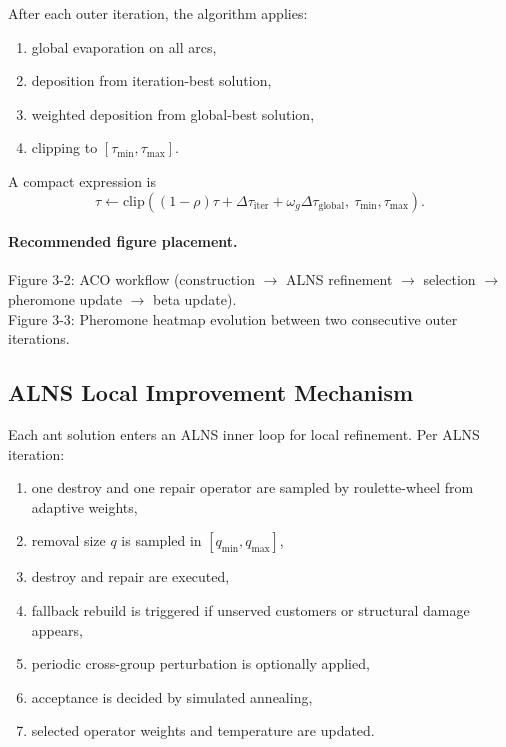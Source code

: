 \documentclass[review,12pt]{elsarticle}
\begin{document}
After each outer iteration, the algorithm applies:
\begin{enumerate}
  \item global evaporation on all arcs,
  \item deposition from iteration-best solution,
  \item weighted deposition from global-best solution,
  \item clipping to \([\tau_{\min},\tau_{\max}]\).
\end{enumerate}
A compact expression is
\begin{equation}
\tau \leftarrow \mathrm{clip}\!\left((1-\rho)\tau + \Delta\tau_{\mathrm{iter}} + \omega_g\Delta\tau_{\mathrm{global}},\ \tau_{\min},\tau_{\max}\right).
\label{eq:pheromone_update}
\end{equation}

\paragraph{Recommended figure placement.}
Figure 3-2: ACO workflow (construction \(\rightarrow\) ALNS refinement \(\rightarrow\) selection \(\rightarrow\) pheromone update \(\rightarrow\) beta update).\\
Figure 3-3: Pheromone heatmap evolution between two consecutive outer iterations.

\subsection{ALNS Local Improvement Mechanism}
\label{subsec:alns_local}

Each ant solution enters an ALNS inner loop for local refinement. Per ALNS iteration:
\begin{enumerate}
  \item one destroy and one repair operator are sampled by roulette-wheel from adaptive weights,
  \item removal size \(q\) is sampled in \([q_{\min},q_{\max}]\),
  \item destroy and repair are executed,
  \item fallback rebuild is triggered if unserved customers or structural damage appears,
  \item periodic cross-group perturbation is optionally applied,
  \item acceptance is decided by simulated annealing,
  \item selected operator weights and temperature are updated.
\end{enumerate}
\end{document}
